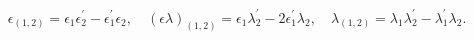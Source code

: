 \begin{equation}
\epsilon _{(1,2)}=\epsilon _{1}\epsilon _{2}^{\prime }-\epsilon _{1}^{\prime
}\epsilon _{2},\quad (\epsilon \lambda )_{(1,2)}=\epsilon _{1}\lambda
_{2}^{\prime }-2\epsilon _{1}^{\prime }\lambda _{2},\quad \lambda
_{(1,2)}=\lambda _{1}\lambda _{2}^{\prime }-\lambda _{1}^{\prime }\lambda
_{2}.  \label{param2}
\end{equation}

